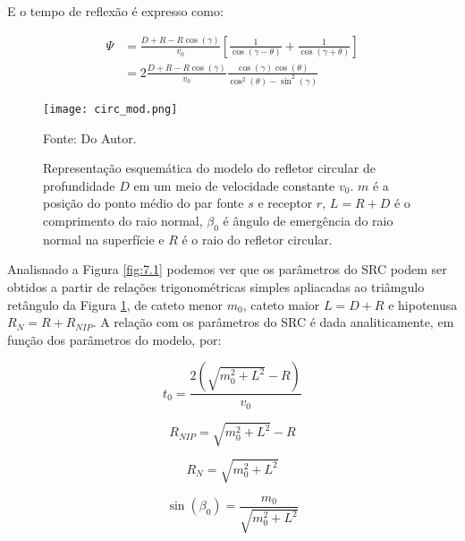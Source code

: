 E o tempo de reflexão é expresso como:

\begin{equation}
\begin{flalign*}
\label{eq:7.3}
 \Psi &=\frac{D+R-R\cos(\gamma)}{v_0} \left[ \frac{1}{\cos(\gamma-\theta)}+\frac{1}{\cos(\gamma+\theta)} \right] \\
 &=2\frac{D+R-R\cos(\gamma)}{v_0}\frac{\cos(\gamma)\cos(\theta)}{\cos^2(\theta)-\sin^2(\gamma)}
\end{flalign*} 
\end{equation}


\begin{figure}[htb]
\caption{Representação esquemática do modelo do refletor circular de profundidade $D$
em um meio de velocidade constante $v_0$.
$m$ é a posição do ponto médio do par fonte $s$ e receptor $r$, $L=R+D$ é o comprimento do raio normal, 
$\beta_0$ é ângulo de emergência
do raio normal na superfície e $R$ é o raio do refletor circular.}
\begin{flushleft}
\texttt{[image: circ\_mod.png]}
\vspace{-0.3cm}
\end{flushleft}
\begin{center}
 Fonte: Do Autor.
\end{center}
\label{fig:7.3}
\end{figure}

Analisnado a Figura \ref{fig:7.1} podemos ver que os parâmetros do SRC podem ser obtidos a partir
de relações trigonométricas simples apliacadas ao triâmgulo retângulo da Figura \ref{fig:7.3}, de cateto menor
$m_0$, cateto maior $L=D+R$ e hipotenusa $R_N=R+R_{NIP}$.
A relação com os parâmetros do SRC é dada analiticamente, em função dos parâmetros do modelo, por:

\begin{equation}
\label{eq:7.4}
t_0=\frac{2(\sqrt{m_0^2+L^2}-R)}{v_0}
\end{equation}

\begin{equation}
\label{eq:7.5}
R_{NIP}=\sqrt{m_0^2+L^2}-R
\end{equation}

\begin{equation}
\label{eq:7.6}
R_N =\sqrt{m_0^2+L^2}
\end{equation}

\begin{equation}
\label{eq:7.7}
\sin(\beta_0)=\frac{m_0}{\sqrt{m_0^2+L^2}}
\end{equation}


